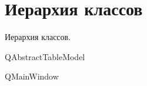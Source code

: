 \section{Иерархия классов}
Иерархия классов.\begin{DoxyCompactList}
\item Q\+Abstract\+Table\+Model\begin{DoxyCompactList}
\item {}
\end{DoxyCompactList}
\item Q\+Main\+Window\begin{DoxyCompactList}
\item {}
\end{DoxyCompactList}
\end{DoxyCompactList}
